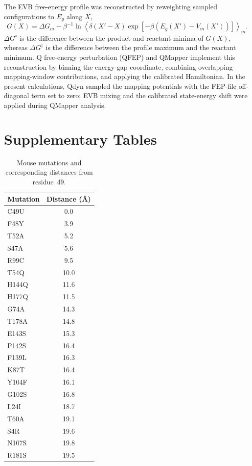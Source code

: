\documentclass[journal=jpcbfk,manuscript=suppinfo]{achemso}
\begin{document}
The EVB free-energy profile was reconstructed by reweighting sampled configurations to $E_g$ along $X$,
\begin{equation}
G(X)=\Delta G_m-\beta^{-1}\ln\left\langle
\delta(X'-X)\exp[-\beta(E_g(X')-V_m(X'))]\right\rangle_m.
\label{eq:evb_reweighting}
\end{equation}
$\Delta G^{\circ}$ is the difference between the product and reactant minima of $G(X)$, whereas $\Delta G^{\ddagger}$ is the difference between the profile maximum and the reactant minimum. Q free-energy perturbation (QFEP) and QMapper implement this reconstruction by binning the energy-gap coordinate, combining overlapping mapping-window contributions, and applying the calibrated Hamiltonian. In the present calculations, Qdyn sampled the mapping potentials with the FEP-file off-diagonal term set to zero; EVB mixing and the calibrated state-energy shift were applied during QMapper analysis.\cite{marelius_q_1999,PurgBauer2017Qtools,oanca_efficient_2023}

\clearpage
\section{Supplementary Tables}

\begin{table}[htbp]
\centering
\caption[Mouse pathway mutation distances]{Mouse mutations and corresponding distances from residue~49.}
\label{tab:mouse_mutation_distance}
\begin{tabular}{lc}
\toprule
\textbf{Mutation} & \textbf{Distance (\AA)} \\
\midrule
C49U & 0.0 \\
F48Y & 3.9 \\
T52A & 5.2 \\
S47A & 5.6 \\
R99C & 9.5 \\
T54Q & 10.0 \\
H144Q & 11.6 \\
H177Q & 11.5 \\
G74A & 14.3 \\
T178A & 14.8 \\
E143S & 15.3 \\
P142S & 16.4 \\
F139L & 16.3 \\
K87T & 16.4 \\
Y104F & 16.1 \\
G102S & 16.8 \\
L24I & 18.7 \\
T60A & 19.1 \\
S4R & 19.6 \\
N107S & 19.8 \\
R181S & 19.5 \\
\bottomrule
\end{tabular}
\end{table}
\end{document}
